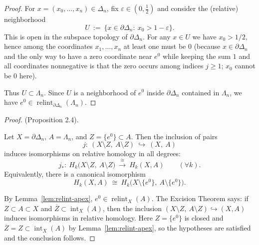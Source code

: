 \begin{proof}
For $x=(x_0,\dots,x_n)\in \Delta_n$,
fix $\varepsilon\in(0,\tfrac12)$ and consider the (relative) neighborhood
\[
U\ :=\ \bigl\{x\in\partial\Delta_n:\ x_0>1-\varepsilon\bigr\}.
\]
This is open in the subspace topology of $\partial\Delta_n$. For any $x\in U$ we have $x_0>1/2$, hence among the coordinates $x_1,\dots,x_n$ at least one must be $0$
(because $x\in\partial\Delta_n$ and the only way to have a zero coordinate near $e^0$ while keeping the sum $1$ and all coordinates nonnegative is that the zero occurs among indices $j\ge1$; $x_0$ cannot be $0$ here).

Thus $U\subset\Lambda_n$. Since $U$ is a neighborhood of $e^0$ inside $\partial\Delta_n$ contained in $\Lambda_n$,
we have $e^0\in\operatorname{relint}_{\partial\Delta_n}(\Lambda_n)$.
\end{proof}

\begin{proof}(Proposition 2.4).

Let $X=\partial\Delta_n$, $A=\Lambda_n$, and $Z=\{e^0\}\subset A$.
Then the inclusion of pairs
\[
j:\ (X\setminus Z,\ A\setminus Z)\ \hookrightarrow\ (X,\ A)
\]
induces isomorphisms on relative homology in all degrees:
\[
j_*:\ H_k\bigl(X\setminus Z,\ A\setminus Z\bigr)\ \xrightarrow{\ \cong\ }\ H_k(X,A)\qquad(\forall k).
\]
Equivalently, there is a canonical isomorphism
\[
H_k(X,A)\ \cong\ H_k\bigl(X\setminus\{e^0\},\ A\setminus\{e^0\}\bigr).
\]

By Lemma~\ref{lem:relint-apex}, $e^0\in\operatorname{relint}_X(A)$.
The Excision Theorem says:
if $Z\subset A\subset X$ and $\overline{Z}\subset\operatorname{int}_X(A)$,
then the inclusion $(X\setminus Z,\ A\setminus Z)\hookrightarrow (X,A)$ induces isomorphisms in relative homology.
Here $Z=\{e^0\}$ is closed and $\overline{Z}=Z\subset\operatorname{int}_X(A)$ by Lemma~\ref{lem:relint-apex},
so the hypotheses are satisfied and the conclusion follows.
\end{proof}



